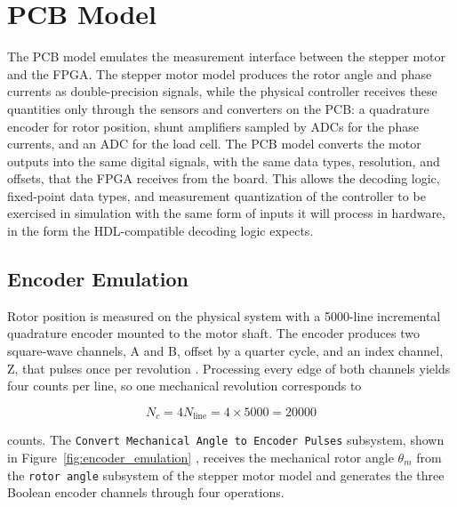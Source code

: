 \section{PCB Model}\label{pcbModel}

The PCB model emulates the measurement interface between the stepper motor and the FPGA. The stepper motor model produces the rotor angle and phase currents as double-precision signals, while the physical controller receives these quantities only through the sensors and converters on the PCB: a quadrature encoder for rotor position, shunt amplifiers sampled by ADCs for the phase currents, and an ADC for the load cell. The PCB model converts the motor outputs into the same digital signals, with the same data types, resolution, and offsets, that the FPGA receives from the board. This allows the decoding logic, fixed-point data types, and measurement quantization of the controller to be exercised in simulation with the same form of inputs it will process in hardware, in the form the HDL-compatible decoding logic expects. 


\subsection{Encoder Emulation}\label{sec:encoderEmulation}

Rotor position is measured on the physical system with a 5000-line incremental quadrature encoder mounted to the motor shaft. The encoder produces two square-wave channels, A and B, offset by a quarter cycle, and an index channel, Z, that pulses once per revolution \cite{dings_ek2_2026}. Processing every edge of both channels yields four counts per line, so one mechanical revolution corresponds to

\begin{equation}
	N_c = 4 N_{\mathrm{line}} = 4 \times 5000 = 20000
	\label{eq:enc_counts}
\end{equation}

counts. The \texttt{Convert Mechanical Angle to Encoder Pulses} subsystem, shown in Figure~\ref{fig:encoder_emulation} %
, receives the mechanical rotor angle $\theta_m$ from the \texttt{rotor angle} subsystem of the stepper motor model and generates the three Boolean encoder channels through four operations.

